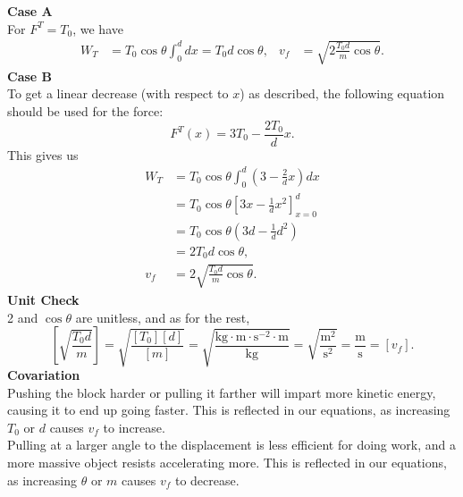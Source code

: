 \documentclass[]{article}
\begin{document}
\begin{TeacherMargin}
\noindent\textbf{Case A} \\
For $F^{T} = T_{0}$, we have
\begin{align*}
	W_{T} & = T_{0}\cos\theta\int_{0}^{d}dx = T_{0}d\cos\theta, & v_{f} & = \sqrt{2\frac{T_{0}d}{m}\cos\theta}.
\end{align*}
\textbf{Case B} \\
To get a linear decrease (with respect to $x$) as described, the following equation should be used for the force:
\[
F^{T}(x) = 3T_{0}-\frac{2T_{0}}{d}x.
\]
This gives us
\begin{align*}
	W_{T} & = T_{0}\cos\theta\int_{0}^{d}\left(3-\frac{2}{d}x\right)dx \\
	& = T_{0}\cos\theta\left[3x-\frac{1}{d}x^{2}\right]_{x=0}^{d} \\
	& = T_{0}\cos\theta\left(3d-\frac{1}{d}d^{2}\right) \\
	& = 2T_{0}d\cos\theta, \\
	v_{f} & = 2\sqrt{\frac{T_{0}d}{m}\cos\theta}.
\end{align*}
\textbf{Unit Check} \\
2 and $\cos\theta$ are unitless, and as for the rest,
\[
\left[\sqrt{\frac{T_{0}d}{m}}\right] = \sqrt{\frac{[T_{0}][d]}{[m]}} = \sqrt{\frac{\text{kg}\cdot\text{m}\cdot\text{s}^{-2}\cdot\text{m}}{\text{kg}}} = \sqrt{\frac{\text{m}^{2}}{\text{s}^{2}}} = \frac{\text{m}}{\text{s}} = [v_{f}].
\]
\textbf{Covariation} \\
Pushing the block harder or pulling it farther will impart more kinetic energy, causing it to end up going faster. This is reflected in our equations, as increasing $T_{0}$ or $d$ causes $v_{f}$ to increase. \\
Pulling at a larger angle to the displacement is less efficient for doing work, and a more massive object resists accelerating more. This is reflected in our equations, as increasing $\theta$ or $m$ causes $v_{f}$ to decrease.
\end{TeacherMargin}
\end{document}
